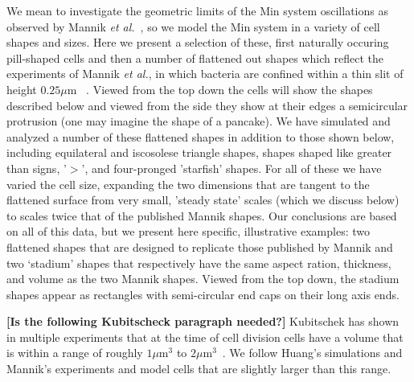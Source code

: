 \documentclass[letterpaper,twocolumn,amsmath,amssymb,pre]{revtex4-1}
\newcommand{\red}[1]{{\bf \color{red} #1}}
\newcommand{\fixme}[1]{\red{[#1]}}
\newcommand\micron{\ensuremath{\mu\text{m}}}
\begin{document}
We mean to investigate the geometric limits of the Min system
oscillations as observed by Mannik \emph{et
  al.}~\cite{mannik2012robustness}, so we model the Min system in a
variety of cell shapes and sizes.  Here we present a selection of
these, first naturally occuring pill-shaped cells and then a number of
flattened out shapes which reflect the experiments of Mannik \emph{et
  al.}, in which bacteria are confined within a thin slit of height
$0.25\micron$ ~\cite{mannik2012robustness}. Viewed from the top down
the cells will show the shapes described below and viewed from the
side they show at their edges a semicircular protrusion (one may
imagine the shape of a pancake). We have simulated and analyzed a
number of these flattened shapes in addition to those shown below,
including equilateral and iscosolese triangle shapes, shapes shaped
like greater than signs, '$>$', and four-pronged 'starfish' shapes.
For all of these we have varied the cell size, expanding the two
dimensions that are tangent to the flattened surface from very small,
'steady state' scales (which we discuss below) to scales twice that of
the published Mannik shapes.  Our conclusions are based on all of this
data, but we present here specific, illustrative examples: two
flattened shapes that are designed to replicate those published by
Mannik and two `stadium' shapes that respectively have the same aspect
ration, thickness, and volume as the two Mannik shapes.  Viewed from
the top down, the stadium shapes appear as rectangles with
semi-circular end caps on their long axis ends.


\fixme{Is the following Kubitscheck paragraph needed?}
Kubitschek has shown in multiple experiments that at the time of cell
division cells have a volume that is within a range of roughly
$1\micron^3$ to $2\micron^3$~\cite{kubitschek1990cell,
  kubitschek1968linear}.  We follow Huang's
simulations\cite{huang2003dynamic} and Mannik's experiments and model
cells that are slightly larger than this range.
\end{document}
